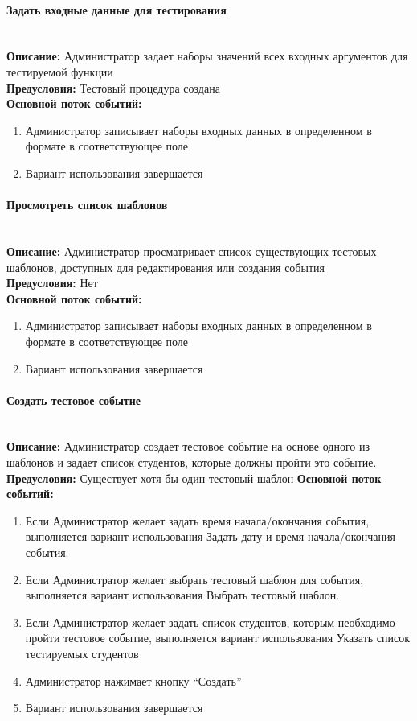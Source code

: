 \documentclass{article}
\newcommand{\paragraphline}[1]{\paragraph{#1}\mbox{}\\}
\begin{document}
    \paragraphline{Задать входные данные для тестирования}
    \textbf{Описание:} Администратор задает наборы значений всех входных аргументов для тестируемой функции\\
    \textbf{Предусловия:} Тестовый процедура создана\\
    \textbf{Основной поток событий:}
    \begin{enumerate}
        \item Администратор записывает наборы входных данных в определенном в формате в соответствующее поле
        \item Вариант использования завершается
    \end{enumerate}
    
    \paragraphline{Просмотреть список шаблонов}
    \textbf{Описание:} Администратор просматривает список существующих тестовых шаблонов, доступных для редактирования или создания события\\
    \textbf{Предусловия:} Нет\\
    \textbf{Основной поток событий:}
    \begin{enumerate}
        \item Администратор записывает наборы входных данных в определенном в формате в соответствующее поле
        \item Вариант использования завершается
    \end{enumerate}

    
    \paragraphline{Создать тестовое событие}
    \textbf{Описание:} Администратор создает тестовое событие на основе одного из шаблонов и задает список студентов, которые должны пройти это событие.
    \textbf{Предусловия:} Существует хотя бы один тестовый шаблон
    \textbf{Основной поток событий:}
    \begin{enumerate}
        \item Если Администратор желает задать время начала/окончания события, выполняется вариант использования Задать дату и время начала/окончания события.
        \item Если Администратор желает выбрать тестовый шаблон для события, выполняется вариант использования Выбрать тестовый шаблон.
        \item Если Администратор желает задать список студентов, которым необходимо пройти тестовое событие, выполняется вариант использования Указать список тестируемых студентов
        \item Администратор нажимает кнопку “Создать”
        \item Вариант использования завершается
    \end{enumerate}
\end{document}
